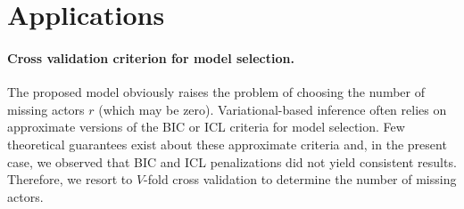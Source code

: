 \section{Applications}  \label{sec:Appli}


\paragraph{Cross validation criterion for  model selection. \\}
%

The proposed model obviously raises the problem of choosing the number of missing actors $r$ (which may be zero). Variational-based inference often relies on approximate versions of the BIC or ICL criteria for model selection. Few theoretical guarantees exist about these approximate criteria and, in the present case, we observed that BIC and ICL penalizations did not yield consistent results. Therefore, we resort to $V$-fold cross validation to determine the number of missing actors. 

